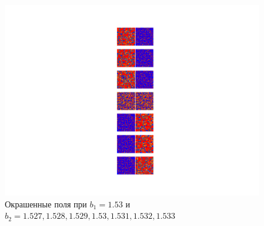 \documentclass[12pt]{article}
\begin{document}
    \begin{figure}[H]
         \centering
         \includegraphics[width=0.95\columnwidth, keepaspectratio=True]{DoubleField/colored_2fields153.png}
         \caption{Окрашенные поля при $b_1=1.53$ и $b_2=1.527, 1.528, 1.529, 1.53, 1.531, 1.532, 1.533$}
         \label{fig:DfieldsFixb1}
    \end{figure}
\end{document}
